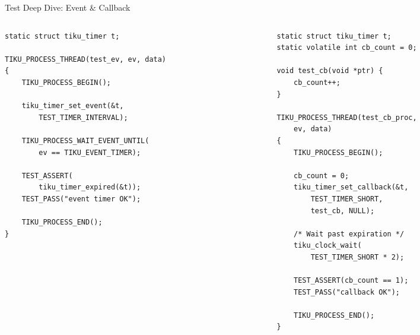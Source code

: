 \documentclass[aspectratio=169, 10pt]{beamer}
\begin{document}
\begin{frame}[fragile]{Test Deep Dive: Event \& Callback}
\begin{columns}[T]
\begin{column}{0.48\textwidth}
\begin{lstlisting}[style=cstyle, title={Event timer test}]
static struct tiku_timer t;

TIKU_PROCESS_THREAD(test_ev, ev, data)
{
    TIKU_PROCESS_BEGIN();

    tiku_timer_set_event(&t,
        TEST_TIMER_INTERVAL);

    TIKU_PROCESS_WAIT_EVENT_UNTIL(
        ev == TIKU_EVENT_TIMER);

    TEST_ASSERT(
        tiku_timer_expired(&t));
    TEST_PASS("event timer OK");

    TIKU_PROCESS_END();
}
\end{lstlisting}
\end{column}

\begin{column}{0.48\textwidth}
\begin{lstlisting}[style=cstyle, title={Callback timer test}]
static struct tiku_timer t;
static volatile int cb_count = 0;

void test_cb(void *ptr) {
    cb_count++;
}

TIKU_PROCESS_THREAD(test_cb_proc,
    ev, data)
{
    TIKU_PROCESS_BEGIN();

    cb_count = 0;
    tiku_timer_set_callback(&t,
        TEST_TIMER_SHORT,
        test_cb, NULL);

    /* Wait past expiration */
    tiku_clock_wait(
        TEST_TIMER_SHORT * 2);

    TEST_ASSERT(cb_count == 1);
    TEST_PASS("callback OK");

    TIKU_PROCESS_END();
}
\end{lstlisting}
\end{column}
\end{columns}
\end{frame}
\end{document}
